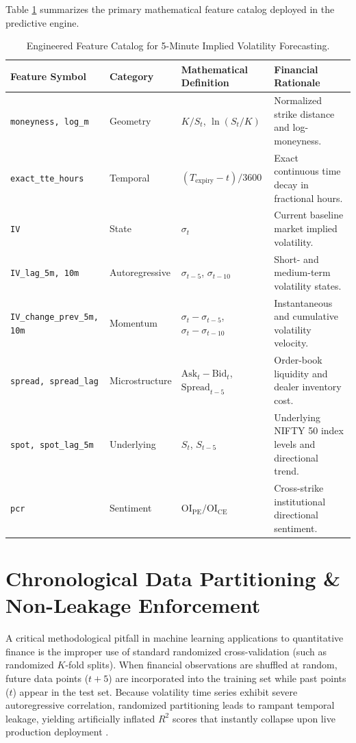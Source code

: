 Table \ref{tab:master_feature_catalog} summarizes the primary mathematical feature catalog deployed in the predictive engine.

\begin{table}[H]
    \centering
    \scriptsize
    \renewcommand{\arraystretch}{0.90}
    \caption{Engineered Feature Catalog for 5-Minute Implied Volatility Forecasting.}
    \label{tab:master_feature_catalog}
    \begin{tabularx}{\textwidth}{llp{3.8cm}X}
        \toprule
        \textbf{Feature Symbol} & \textbf{Category} & \textbf{Mathematical Definition} & \textbf{Financial Rationale} \\
        \midrule
        \texttt{moneyness, log\_m} & Geometry & $K / S_t$, $\ln(S_t / K)$ & Normalized strike distance and log-moneyness. \\
        \texttt{exact\_tte\_hours} & Temporal & $(T_{\text{expiry}} - t) / 3600$ & Exact continuous time decay in fractional hours. \\
        \texttt{IV} & State & $\sigma_t$ & Current baseline market implied volatility. \\
        \texttt{IV\_lag\_5m, 10m} & Autoregressive & $\sigma_{t-5}$, $\sigma_{t-10}$ & Short- and medium-term volatility states. \\
        \texttt{IV\_change\_prev\_5m, 10m} & Momentum & $\sigma_t - \sigma_{t-5}$, $\sigma_t - \sigma_{t-10}$ & Instantaneous and cumulative volatility velocity. \\
        \texttt{spread, spread\_lag} & Microstructure & $\text{Ask}_t - \text{Bid}_t$, $\text{Spread}_{t-5}$ & Order-book liquidity and dealer inventory cost. \\
        \texttt{spot, spot\_lag\_5m} & Underlying & $S_t$, $S_{t-5}$ & Underlying NIFTY 50 index levels and directional trend. \\
        \texttt{pcr} & Sentiment & $\text{OI}_{\text{PE}} / \text{OI}_{\text{CE}}$ & Cross-strike institutional directional sentiment. \\
        \bottomrule
    \end{tabularx}
\end{table}

\section{Chronological Data Partitioning \& Non-Leakage Enforcement}
\label{sec:chronological_partitioning}

A critical methodological pitfall in machine learning applications to quantitative finance is the improper use of standard randomized cross-validation (such as randomized $K$-fold splits). When financial observations are shuffled at random, future data points ($t+5$) are incorporated into the training set while past points ($t$) appear in the test set. Because volatility time series exhibit severe autoregressive correlation, randomized partitioning leads to rampant temporal leakage, yielding artificially inflated $R^2$ scores that instantly collapse upon live production deployment \cite{lopez2018advances}.

